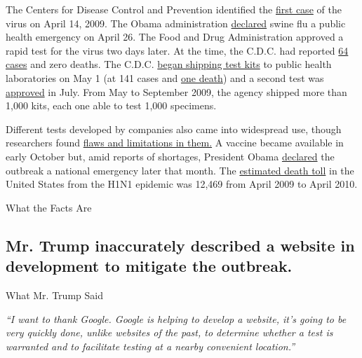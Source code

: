 The Centers for Disease Control and Prevention identified the
\href{https://www.cdc.gov/mmwr/preview/mmwrhtml/mm5815a5.htm}{first
case} of the virus on April 14, 2009. The Obama administration
\href{https://www.dhs.gov/news/2009/04/26/press-briefing-swine-influenza}{declared}
swine flu a public health emergency on April 26. The Food and Drug
Administration approved a rapid test for the virus two days later. At
the time, the C.D.C. had reported
\href{https://www.cdc.gov/h1n1flu/updates/042809.htm}{64 cases} and zero
deaths. The C.D.C.
\href{https://www.cdc.gov/h1n1flu/cdcresponse.htm\#CDC_Laboratories_Bolster_Nations_Testing}{began
shipping test kits} to public health laboratories on May 1 (at 141 cases
and \href{https://www.cdc.gov/h1n1flu/updates/050109.htm}{one death})
and a second test was
\href{https://web.archive.org/web/20090729221914/http://www.fda.gov/NewsEvents/Newsroom/PressAnnouncements/ucm173543.htm}{approved}
in July. From May to September 2009, the agency shipped more than 1,000
kits, each one able to test 1,000 specimens.

Different tests developed by companies also came into widespread use,
though researchers found
\href{https://www.nytimes3xbfgragh.onion/2009/08/06/health/06flu.html}{flaws
and limitations in them.} A vaccine became available in early October
but, amid reports of shortages, President Obama
\href{https://www.nytimes3xbfgragh.onion/2009/10/25/us/politics/25flu.html}{declared}
the outbreak a national emergency later that month. The
\href{https://www.ncbi.nlm.nih.gov/pubmed/21342903}{estimated death
toll} in the United States from the H1N1 epidemic was 12,469 from April
2009 to April 2010.

What the Facts Are

\hypertarget{mr-trump-inaccurately-described-a-website-in-development-to-mitigate-the-outbreak}{%
\subsection{Mr. Trump inaccurately described a website in development to
mitigate the
outbreak.}\label{mr-trump-inaccurately-described-a-website-in-development-to-mitigate-the-outbreak}}

What Mr. Trump Said

\emph{``I want to thank Google. Google is helping to develop a website,
it's going to be very quickly done, unlike websites of the past, to
determine whether a test is warranted and to facilitate testing at a
nearby convenient location.''}

